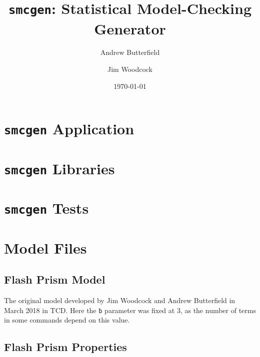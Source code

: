 \documentclass[fleqn,10pt]{report}
\author{
Andrew Butterfield \and Jim Woodcock
}
\title{
  \texttt{smcgen}:
  Statistical Model-Checking Generator
}
\date{
\today
}
\begin{document}
\maketitle
\tableofcontents

\chapter{\texttt{smcgen} Application}



\chapter{\texttt{smcgen} Libraries}



\chapter{\texttt{smcgen} Tests}



\chapter{Model Files}

\section{Flash Prism Model}

The original model developed by Jim Woodcock and Andrew Butterfield
in March 2018 in TCD. Here the \texttt{b} parameter was fixed at 3,
as the number of terms in some commands depend on this value.



\newpage
\section{Flash Prism Properties}




\end{document}
